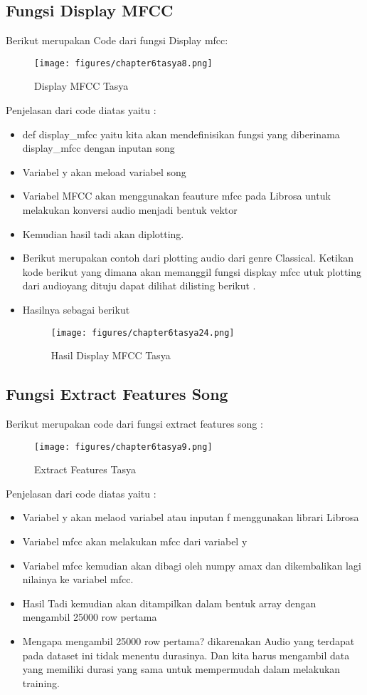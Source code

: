 \subsection{Fungsi Display MFCC}
Berikut merupakan Code dari fungsi Display mfcc: 
\begin{figure}[ht]
\centering
\texttt{[image: figures/chapter6tasya8.png]}
\caption{Display MFCC Tasya}
\label{Praktek}
\end{figure}
Penjelasan dari code diatas yaitu :
\begin{itemize}
\item def display\_mfcc yaitu kita akan mendefinisikan fungsi yang diberinama display\_mfcc dengan inputan song
\item Variabel y akan meload variabel song
\item Variabel MFCC akan menggunakan feauture mfcc pada Librosa untuk melakukan konversi audio menjadi bentuk vektor
\item Kemudian hasil tadi akan diplotting.
\item Berikut merupakan contoh dari plotting audio dari genre Classical. Ketikan kode berikut  yang dimana akan memanggil fungsi dispkay mfcc utuk plotting dari audioyang dituju dapat dilihat dilisting berikut .

\item Hasilnya sebagai berikut 
\begin{figure}[ht]
\centering
\texttt{[image: figures/chapter6tasya24.png]}
\caption{Hasil Display MFCC Tasya}
\label{Praktek}
\end{figure}
\end{itemize}

\subsection{Fungsi Extract Features Song}
Berikut merupakan code dari fungsi extract features song :
\begin{figure}[ht]
\centering
\texttt{[image: figures/chapter6tasya9.png]}
\caption{Extract Features Tasya}
\label{Praktek}
\end{figure}
Penjelasan dari code diatas yaitu :
\begin{itemize}
\item Variabel y akan melaod variabel atau inputan f menggunakan librari Librosa
\item Variabel mfcc akan melakukan mfcc dari variabel y
\item Variabel mfcc kemudian akan dibagi oleh numpy amax dan dikembalikan lagi nilainya ke variabel mfcc.
\item Hasil Tadi kemudian akan ditampilkan dalam bentuk array dengan mengambil 25000 row pertama
\item Mengapa mengambil 25000 row pertama? dikarenakan Audio yang terdapat pada dataset ini tidak menentu durasinya. Dan kita harus mengambil data yang memiliki durasi yang sama untuk mempermudah dalam melakukan training.
\end{itemize}

